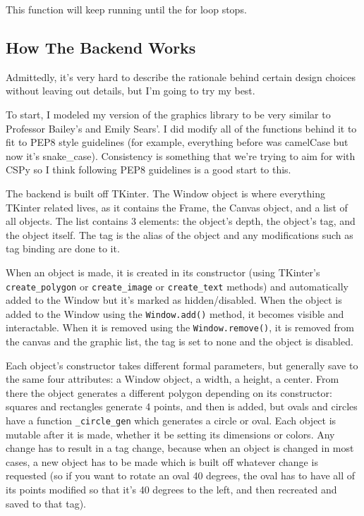 \documentclass{article}
\begin{document}
This function will keep running until the for loop stops.

\subsection{How The Backend Works}

Admittedly, it's very hard to describe the rationale behind certain design choices without leaving out details, but I'm going to try my best.

To start, I modeled my version of the graphics library to be very similar to Professor Bailey's and Emily Sears'. I did modify all of the functions behind it to fit to PEP8 style guidelines (for example, everything before was camelCase but now it's snake\_case). Consistency is something that we're trying to aim for with CSPy so I think following PEP8 guidelines is a good start to this.

The backend is built off TKinter. The Window object is where everything TKinter related lives, as it contains the Frame, the Canvas object, and a list of all objects. The list contains 3 elements: the object's depth, the object's tag, and the object itself. The tag is the alias of the object and any modifications such as tag binding are done to it.

When an object is made, it is created in its constructor (using TKinter's \verb|create_polygon| or \verb|create_image| or \verb|create_text| methods) and automatically added to the Window but it's marked as hidden/disabled. When the object is added to the Window using the \verb|Window.add()| method, it becomes visible and interactable. When it is removed using the \verb|Window.remove()|, it is removed from the canvas and the graphic list, the tag is set to none and the object is disabled.

Each object's constructor takes different formal parameters, but generally save to the same four attributes: a Window object, a width, a height, a center. From there the object generates a different polygon depending on its constructor: squares and rectangles generate 4 points, and then is added, but ovals and circles have a function \verb|_circle_gen| which generates a circle or oval. Each object is mutable after it is made, whether it be setting its dimensions or colors. Any change has to result in a tag change, because when an object is changed in most cases, a new object has to be made which is built off whatever change is requested (so if you want to rotate an oval 40 degrees, the oval has to have all of its points modified so that it's 40 degrees to the left, and then recreated and saved to that tag).
\end{document}
